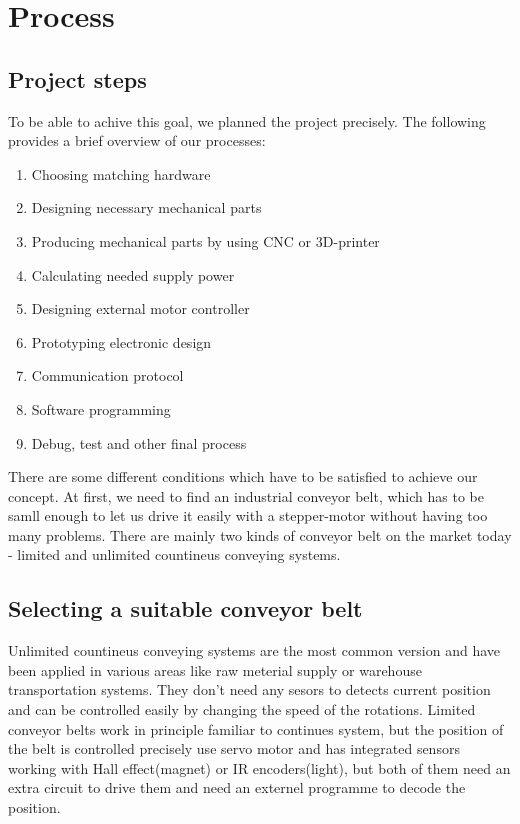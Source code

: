 \documentclass[11pt,a4paper]{article}
\begin{document}

\newpage
\section{Process}
\subsection{Project steps}
To be able to achive this goal, we planned the project precisely. The following provides a brief overview of our processes:

\begin{enumerate}
\item Choosing matching hardware 
\item Designing necessary mechanical parts
\item Producing mechanical parts by using CNC or 3D-printer 
\item Calculating needed supply power 
\item Designing external motor controller 
\item Prototyping electronic design
\item Communication protocol 
\item Software programming 
\item Debug, test and other final process 
\end{enumerate}

There are some different conditions which have to be satisfied to achieve our concept. At first, we need to find an industrial conveyor belt, which has to be samll enough to let us drive it easily with a stepper-motor without having too many problems. There are mainly two kinds of conveyor belt on the market today - limited and unlimited countineus conveying systems.\\

\subsection{Selecting a suitable conveyor belt}
Unlimited countineus conveying systems are the most common version and have been applied in various areas like raw meterial supply or warehouse transportation systems. They don't need any sesors to detects current position and can be controlled easily by changing the speed of the rotations. Limited conveyor belts work in principle familiar to continues system, but the position of the belt is controlled precisely use servo motor and has integrated sensors working with Hall effect(magnet) or IR encoders(light), but both of them need an extra circuit to drive them and need an externel programme to decode the position.\\
\end{document}
